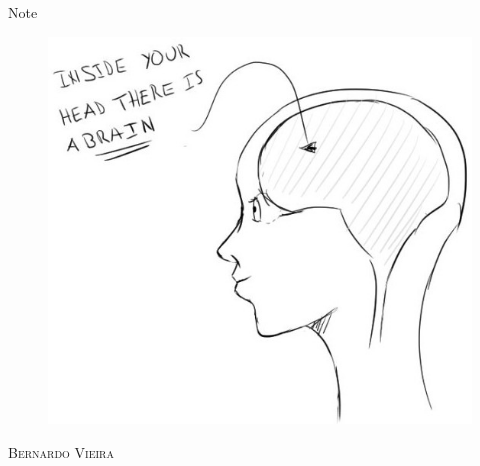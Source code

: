 \begin{titlepage}
\vspace*{\fill}
\begin{center}
{\fontsize{50}{60}\selectfont Note}\\[0.5cm]
\begin{figure}[h]
\begin{center}
\includegraphics[scale=0.5]{Figs/brain.jpg}
\end{center}
\end{figure}
\vspace{4em}
\textsc{\Large Bernardo Vieira}\\[1em]
\end{center}
\vspace*{\fill}
\end{titlepage}

